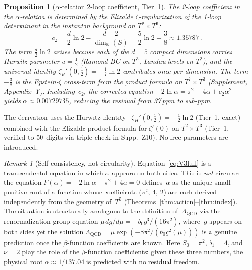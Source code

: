 \documentclass[11pt,a4paper]{article}
\newtheorem{proposition}[theorem]{Proposition}
\theoremstyle{definition}
\theoremstyle{remark}
\newtheorem{remark}[theorem]{Remark}
\begin{document}
\begin{proposition}[$\alpha$-relation 2-loop coefficient, Tier~1]
\label{prop:c2}
The 2-loop coefficient in the $\alpha$-relation is determined by the
Elizalde $\zeta$-regularization of the 1-loop determinant in the
instanton background on $T^2\times T^3$:
\begin{equation}\label{eq:c2}
  c_2 = \frac{d}{2}\ln 2 - \frac{d-2}{\dim_\mathbb{R}(S)}
      = \frac{5}{2}\ln 2 - \frac{3}{8}
      \approx 1.35787\,.
\end{equation}
The term $\frac{d}{2}\ln 2$ arises because each of the $d=5$ compact
dimensions carries Hurwitz parameter $a=\frac{1}{2}$ (Ramond BC on
$T^3$, Landau levels on $T^2$), and the universal identity
$\zeta_H'(0,\frac{1}{2})=-\frac{1}{2}\ln 2$ contributes once per
dimension.  The term $-\frac{3}{8}$ is the Epstein-$\zeta$ cross-term
from the product formula on $T^2\times T^3$ (Supplement, Appendix~Y).
Including~$c_2$, the corrected equation
$-2\ln\alpha=\pi^2-4\alpha+c_2\alpha^2$ yields $\alpha\approx
0.00729735$, reducing the residual from 37\,ppm to sub-ppm.
\end{proposition}

The derivation uses the Hurwitz identity~\cite{ChowlaSelberg1967}
$\zeta_H'(0,\frac{1}{2})=-\frac{1}{2}\ln 2$ (Tier~1, exact) combined
with the Elizalde product formula for $\zeta'(0)$ on $T^2\times T^3$
(Tier~1, verified to 50~digits via triple-check in Supp.~Z10).
No free parameters are introduced.

\begin{remark}[Self-consistency, not circularity]\label{rem:circularity}
Equation~\eqref{eq:V3full} is a transcendental equation in which
$\alpha$ appears on both sides.  This is \emph{not} circular: the
equation $F(\alpha)=-2\ln\alpha-\pi^2+4\alpha=0$ defines~$\alpha$ as the
unique small positive root of a function whose coefficients ($\pi^2$, $4$, $2$)
are each derived independently from the geometry of~$T^5$
(Theorems~\ref{thm:action}--\ref{thm:index}).  The situation is
structurally analogous to the definition of~$\Lambda_{\mathrm{QCD}}$ via
the renormalization-group equation $\mu\,d g/d\mu = -b_0 g^3/(16\pi^2)$,
where~$g$ appears on both sides yet the solution
$\Lambda_{\mathrm{QCD}}=\mu\exp(-8\pi^2/(b_0 g^2(\mu)))$ is a genuine
prediction once the $\beta$-function coefficients are known.  Here
$S_0=\pi^2$, $b_1=4$, and $\nu=2$ play the role of the $\beta$-function
coefficients: given these three numbers, the physical root
$\alpha\approx 1/137.04$ is predicted with no residual freedom.
\end{remark}
\end{document}
